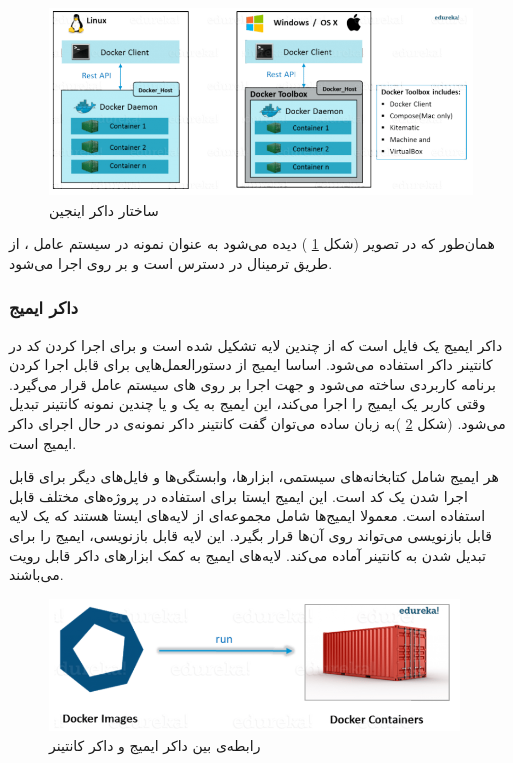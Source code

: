\begin{figure}[!h]
	\centering
	\includegraphics[height=5cm]{fig2-5}
	\caption{ساختار داکر اینجین}
	\label{تصویر 2-5}
\end{figure}

همان‌طور که در تصویر (شکل 
\ref{تصویر 2-5}
) دیده می‌شود به عنوان نمونه در سیستم عامل
،
از طریق ترمینال در دسترس است و
بر روی
اجرا می‌شود. 


\subsubsection*{داکر ایمیج}
داکر ایمیج  یک فایل است که از چندین لایه تشکیل شده است و برای اجرا کردن کد در کانتینر داکر استفاده می‌شود. اساسا ایمیج از دستورالعمل‌هایی برای قابل اجرا کردن برنامه کاربردی ساخته می‌شود و جهت اجرا بر روی 
های سیستم عامل قرار می‌گیرد. وقتی کاربر یک ایمیج را اجرا می‌کند، این ایمیج به یک و یا چندین نمونه کانتینر تبدیل می‌شود. (شکل
\ref{تصویر 2-6}
)به زبان ساده می‌توان گفت کانتینر داکر نمونه‌ی در حال اجرای داکر ایمیج است.

هر ایمیج شامل کتابخانه‌های سیستمی، ابزارها، وابستگی‌ها و فایل‌های دیگر برای قابل اجرا شدن یک کد است. این ایمیج ایستا برای استفاده در پروژه‌های مختلف قابل استفاده است. معمولا ایمیج‌ها شامل مجموعه‌ای از لایه‌های ایستا هستند که یک لایه قابل بازنویسی می‌تواند روی آن‌‌ها قرار بگیرد. این لایه قابل بازنویسی، ایمیج را برای تبدیل شدن به کانتینر آماده می‌کند. لایه‌های ایمیج به کمک ابزارهای داکر قابل رویت می‌باشند.

\begin{figure}[!h]
	\centering
	\includegraphics[height=3.5cm]{fig2-6}
	\caption{رابطه‌ی بین داکر ایمیج و داکر کانتینر}
	\label{تصویر 2-6}
\end{figure}


